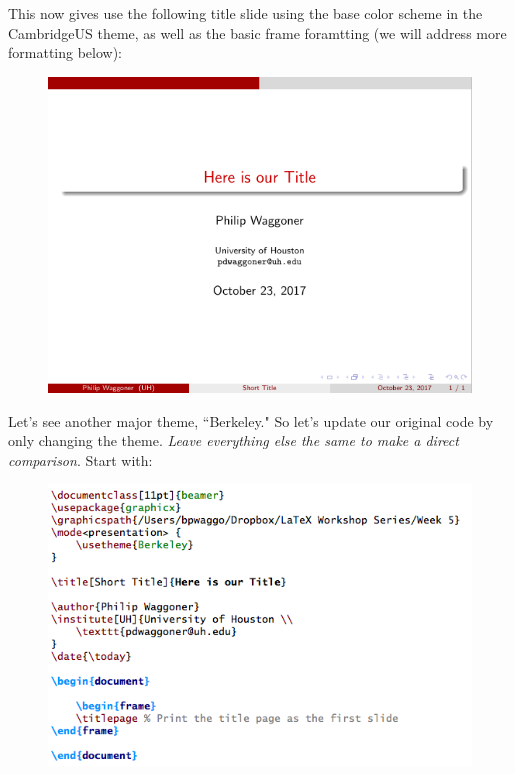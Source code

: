\documentclass[11pt]{article}
\begin{document}
This now gives use the following title slide using the base color scheme in the CambridgeUS theme, as well as the basic frame foramtting (we will address more formatting below):

\begin{figure}[!h]
	\includegraphics[scale=.5]{OUT2}
	\centering
\end{figure}

\newpage

Let's see another major theme, ``Berkeley." So let's update our original code by only changing the theme. \textit{Leave everything else the same to make a direct comparison}. Start with:

\begin{figure}[!h]
	\includegraphics[scale=.5]{CODE3}
	\centering
\end{figure}
\end{document}
